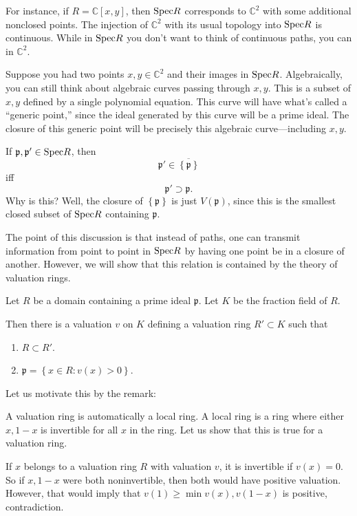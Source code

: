 For instance, if $R = \mathbb{C}[x,y]$, then $\mathrm{Spec} R$ corresponds to
$\mathbb{C}^2$ with some additional nonclosed points.  The injection of
$\mathbb{C}^2$ with its usual topology into $\mathrm{Spec} R$ is continuous. While in
$\mathrm{Spec} R$ you don't want to think of continuous paths, you can in
$\mathbb{C}^2$.

Suppose you had two points $x,y \in \mathbb{C}^2$ and their images in $\mathrm{Spec}
R$.  Algebraically, you can still think about algebraic curves passing through $x,y$.
This is a subset of $x,y$ defined by a single polynomial equation. 
This curve will have what's called a ``generic point,'' since the ideal
generated by this curve will be a prime ideal.
The closure of this generic point will be precisely this algebraic
curve---including $x,y$. 

\begin{remark} 
If $ \mathfrak{p}, \mathfrak{p}' \in \mathrm{Spec} R$, then 
\[ \mathfrak{p}' \in \overline{\left\{\mathfrak{p}\right\}}  \]
iff 
\[ \mathfrak{p}' \supset \mathfrak{p}.  \]
Why is this? Well, the closure of $\left\{\mathfrak{p}\right\}$ is just
$V(\mathfrak{p})$, since this is the smallest closed subset of $\mathrm{Spec} R$
containing $\mathfrak{p}$.  
\end{remark} 

The point of this discussion is that instead of paths, one can transmit
information from point to point in $\mathrm{Spec} R$ by having one point be in a
closure of another.
However, we will show that this relation is contained by the theory of
valuation rings.

\begin{theorem} 
Let $R$ be a domain containing a prime ideal $\mathfrak{p}$.  Let $K$ be the
fraction field of $R$.

Then there is a valuation  $v$ on $K$ defining a valuation ring $R' \subset
K$  such that
\begin{enumerate}
\item $R \subset R'$. 
\item $\mathfrak{p} = \left\{x \in R: v(x) > 0\right\}$.
\end{enumerate}

\end{theorem} 

Let us motivate this by the remark:
\begin{remark} 
A valuation ring is automatically a local ring. A local ring is a ring where
either $x, 1-x$ is invertible for all $x$ in the ring. Let us show that this is
true for a valuation ring. 

If $x $ belongs to a valuation ring $R$ with valuation $v$, it is invertible if
$v(x)=0$.  So if $x, 1-x$ were both noninvertible, then both would have
positive valuation.  However, that would imply that $v(1) \geq \min v(x),
v(1-x)$ is positive, contradiction.
\end{remark} 

